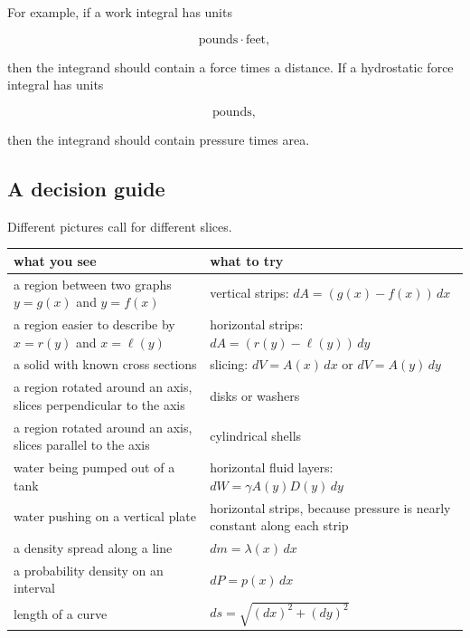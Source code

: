 For example, if a work integral has units

\[
\text{pounds}\cdot\text{feet},
\]

then the integrand should contain a force times a distance.  If a hydrostatic force integral
has units

\[
\text{pounds},
\]

then the integrand should contain pressure times area.

\subsection{A decision guide}
\label{subsec:chapter10-decision-guide}

Different pictures call for different slices.

\begin{center}
\renewcommand{\arraystretch}{1.35}
\begin{tabular}{p{}|p{}}
\textbf{what you see} & \textbf{what to try} \\ \hline

a region between two graphs \(y=g(x)\) and \(y=f(x)\) &
vertical strips: \(\displaystyle dA=(g(x)-f(x))\,dx\) \\

a region easier to describe by \(x=r(y)\) and \(x=\ell(y)\) &
horizontal strips: \(\displaystyle dA=(r(y)-\ell(y))\,dy\) \\

a solid with known cross sections &
slicing: \(\displaystyle dV=A(x)\,dx\) or \(\displaystyle dV=A(y)\,dy\) \\

a region rotated around an axis, slices perpendicular to the axis &
disks or washers \\

a region rotated around an axis, slices parallel to the axis &
cylindrical shells \\

water being pumped out of a tank &
horizontal fluid layers: \(\displaystyle dW=\gamma A(y)D(y)\,dy\) \\

water pushing on a vertical plate &
horizontal strips, because pressure is nearly constant along each strip \\

a density spread along a line &
\(\displaystyle dm=\lambda(x)\,dx\) \\

a probability density on an interval &
\(\displaystyle dP=p(x)\,dx\) \\

length of a curve &
\(\displaystyle ds=\sqrt{(dx)^2+(dy)^2}\)
\end{tabular}
\end{center}

